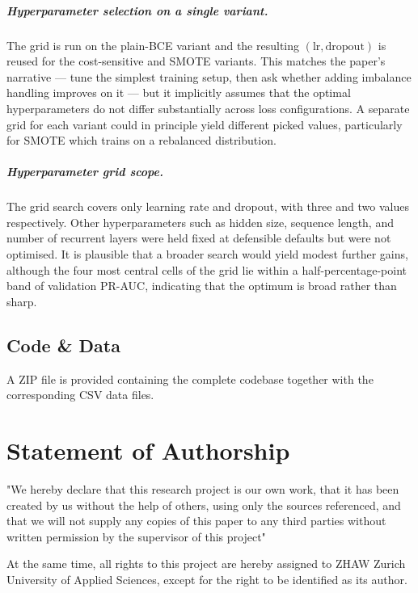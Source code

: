 \documentclass[oneside,12pt,parskip=half,american,numbers=noenddot]{scrreprt}
\begin{document}
\paragraph{Hyperparameter selection on a single variant.} The grid is run on the plain-BCE variant and the resulting $(\text{lr}, \text{dropout})$ is reused for the cost-sensitive and SMOTE variants. This matches the paper's narrative — tune the simplest training setup, then ask whether adding imbalance handling improves on it — but it implicitly assumes that the optimal hyperparameters do not differ substantially across loss configurations. A separate grid for each variant could in principle yield different picked values, particularly for SMOTE which trains on a rebalanced distribution.

\paragraph{Hyperparameter grid scope.} The grid search covers only learning rate and dropout, with three and two values respectively. Other hyperparameters such as hidden size, sequence length, and number of recurrent layers were held fixed at defensible defaults but were not optimised. It is plausible that a broader search would yield modest further gains, although the four most central cells of the grid lie within a half-percentage-point band of validation PR-AUC, indicating that the optimum is broad rather than sharp.


\section{Code \& Data}
\label{app:code}
A ZIP file is provided containing the complete codebase together with the corresponding CSV data files.


\chapter{Statement of Authorship}
\vspace{1cm}
"We hereby declare that this research project is our own work, that it has been created by us without the help of others, using only the sources referenced, and that we will not supply any copies of this paper to any third parties without written permission by the supervisor of this project"

At the same time, all rights to this project are hereby assigned to ZHAW Zurich University of Applied Sciences, except for the right to be identified as its author.
\end{document}
